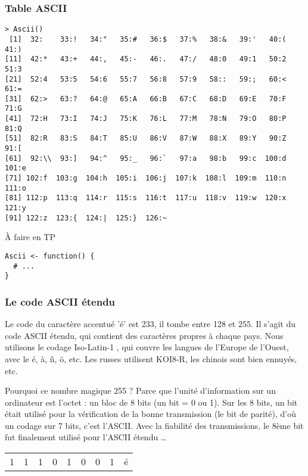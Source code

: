 \documentclass[10pt]{beamer}
\begin{document}
\begin{frame}
  \frametitle{Table ASCII}
  {
    \footnotesize
\begin{verbatim}
> Ascii()
 [1]  32:    33:!   34:"   35:#   36:$   37:%   38:&   39:'   40:(   41:) 
[11]  42:*   43:+   44:,   45:-   46:.   47:/   48:0   49:1   50:2   51:3 
[21]  52:4   53:5   54:6   55:7   56:8   57:9   58::   59:;   60:<   61:= 
[31]  62:>   63:?   64:@   65:A   66:B   67:C   68:D   69:E   70:F   71:G 
[41]  72:H   73:I   74:J   75:K   76:L   77:M   78:N   79:O   80:P   81:Q 
[51]  82:R   83:S   84:T   85:U   86:V   87:W   88:X   89:Y   90:Z   91:[ 
[61]  92:\\  93:]   94:^   95:_   96:`   97:a   98:b   99:c  100:d  101:e 
[71] 102:f  103:g  104:h  105:i  106:j  107:k  108:l  109:m  110:n  111:o 
[81] 112:p  113:q  114:r  115:s  116:t  117:u  118:v  119:w  120:x  121:y 
[91] 122:z  123:{  124:|  125:}  126:~
\end{verbatim}
  }

  \begin{block}{À faire en TP}
    \begin{lstlisting}[style=edblock]
Ascii <- function() {
  # ...
}
\end{lstlisting}
  \end{block}
\end{frame}


\begin{frame}[fragile]
  \frametitle{Le code ASCII étendu}
  Le code du caractère accentué 'é' est 233, il tombe entre 128 et 255.
  Il s'agit du code ASCII étendu, qui contient des caractères propres à chaque pays.
  Nous utilisons le codage Iso-Latin-1 , qui couvre les langues de l'Europe de l'Ouest, avec le \'e, \`a, \~n, \"o, etc.
  Les russes utilisent KOI8-R, les chinois sont bien ennuyés, etc.

  \begin{block}{Pourquoi ce nombre magique 255 ?}
  Parce que l'unité d'information sur un ordinateur est l'octet : un bloc de 8 bits (un bit = 0 ou 1).
Sur les 8 bits, un bit était utilisé pour la vérification de la bonne transmission (le bit de parité), d'où un
codage sur 7 bits, c'est l'ASCII.
Avec la fiabilité des transmissions, le 8ème bit fut finalement utilisé pour l'ASCII étendu \dots

\begin{tabular}{|*{8}{c|}r}
  \cline{1-8}
  1 & 1 & 1& 0 & 1 & 0 & 0 & 1 & é\\ 
  \cline{1-8}
\end{tabular}
\end{block}
\end{frame}
\end{document}
